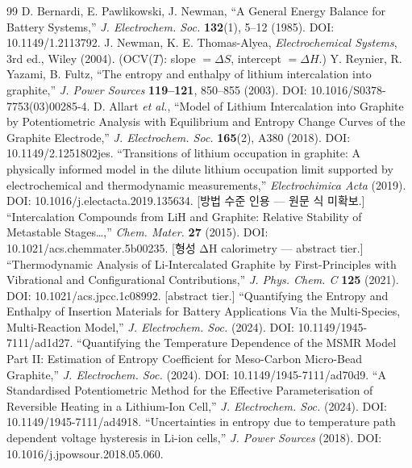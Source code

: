 \documentclass[11pt,a4paper]{article}
\begin{document}
\begin{thebibliography}{99}
 D. Bernardi, E. Pawlikowski, J. Newman, ``A General Energy Balance for Battery Systems,'' \emph{J. Electrochem. Soc.} \textbf{132}(1), 5--12 (1985). DOI: 10.1149/1.2113792.
 J. Newman, K. E. Thomas-Alyea, \emph{Electrochemical Systems}, 3rd ed., Wiley (2004). (OCV($T$): slope $=\Delta S$, intercept $=\Delta H$.)
 Y. Reynier, R. Yazami, B. Fultz, ``The entropy and enthalpy of lithium intercalation into graphite,'' \emph{J. Power Sources} \textbf{119--121}, 850--855 (2003). DOI: 10.1016/S0378-7753(03)00285-4.
 D. Allart \emph{et al.}, ``Model of Lithium Intercalation into Graphite by Potentiometric Analysis with Equilibrium and Entropy Change Curves of the Graphite Electrode,'' \emph{J. Electrochem. Soc.} \textbf{165}(2), A380 (2018). DOI: 10.1149/2.1251802jes.
 ``Transitions of lithium occupation in graphite: A physically informed model in the dilute lithium occupation limit supported by electrochemical and thermodynamic measurements,'' \emph{Electrochimica Acta} (2019). DOI: 10.1016/j.electacta.2019.135634. [방법 수준 인용 — 원문 식 미확보.]
 ``Intercalation Compounds from LiH and Graphite: Relative Stability of Metastable Stages\ldots,'' \emph{Chem. Mater.} \textbf{27} (2015). DOI: 10.1021/acs.chemmater.5b00235. [형성 ΔH calorimetry — abstract tier.]
 ``Thermodynamic Analysis of Li-Intercalated Graphite by First-Principles with Vibrational and Configurational Contributions,'' \emph{J. Phys. Chem. C} \textbf{125} (2021). DOI: 10.1021/acs.jpcc.1c08992. [abstract tier.]
 ``Quantifying the Entropy and Enthalpy of Insertion Materials for Battery Applications Via the Multi-Species, Multi-Reaction Model,'' \emph{J. Electrochem. Soc.} (2024). DOI: 10.1149/1945-7111/ad1d27.
 ``Quantifying the Temperature Dependence of the MSMR Model Part II: Estimation of Entropy Coefficient for Meso-Carbon Micro-Bead Graphite,'' \emph{J. Electrochem. Soc.} (2024). DOI: 10.1149/1945-7111/ad70d9.
 ``A Standardised Potentiometric Method for the Effective Parameterisation of Reversible Heating in a Lithium-Ion Cell,'' \emph{J. Electrochem. Soc.} (2024). DOI: 10.1149/1945-7111/ad4918.
 ``Uncertainties in entropy due to temperature path dependent voltage hysteresis in Li-ion cells,'' \emph{J. Power Sources} (2018). DOI: 10.1016/j.jpowsour.2018.05.060.
\end{thebibliography}
\end{document}
